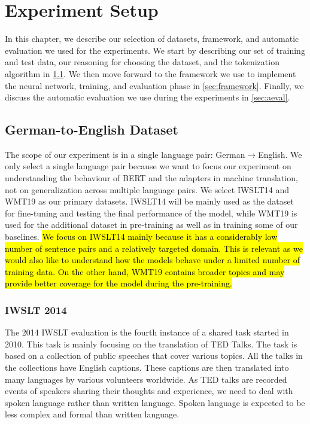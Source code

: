 
\chapter{Experiment Setup}
\label{chap:03}
In this chapter, we describe our selection of datasets, framework, and automatic evaluation we used for the experiments. We start by describing our set of training and test data, our reasoning for choosing the dataset, and the tokenization algorithm in \cref{sec:dataset}. We then move forward to the framework we use to implement the neural network, training, and evaluation phase in \cref{sec:framework}. Finally, we discuss the automatic evaluation we use during the experiments in  \cref{sec:aeval}.

\section{German-to-English Dataset}
\label{sec:dataset}
The scope of our experiment is in a single language pair: German$\rightarrow$English. We only select a single language pair because we want to focus our experiment on understanding the behaviour of BERT and the adapters in machine translation, not on generalization across multiple language pairs. We select IWSLT14 and WMT19 as our primary datasets. IWSLT14 will be mainly used as the dataset for fine-tuning and testing the final performance of the model, while WMT19 is used for the additional dataset in pre-training as well as in training some of our baselines. \hl{We focus on  IWSLT14 mainly because it has a considerably low number of sentence pairs and a relatively targeted domain. This is relevant as we would also like to understand how the models behave under a limited number of training data. On the other hand, WMT19 contains broader topics and may provide better coverage for the model during the pre-training.}

\subsection{IWSLT 2014}
The 2014 IWSLT evaluation  is the fourth instance of a shared task started in 2010. This task is mainly focusing on the translation of TED Talks. The task is based on a collection of public speeches that cover various topics. All the talks in the collections have English captions. These captions are then translated into many languages by various volunteers worldwide. As TED talks are recorded events of speakers sharing their thoughts and experience, we need to deal with spoken language rather than written language. Spoken language is expected to be less complex and formal than written language.

